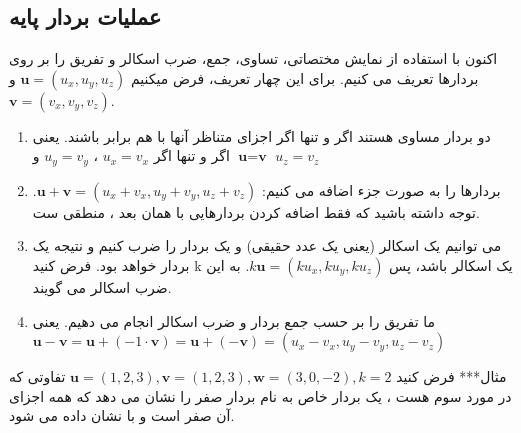 \subsection{\textbf{\LARGE عملیات بردار پایه}}
{
    \Large
    \begin{spacing}{1.5}
        اکنون با استفاده از نمایش مختصاتی، تساوی، جمع، ضرب اسکالر و تفریق را بر روی بردارها تعریف می کنیم.
        برای این چهار تعریف، فرض میکنیم $\textbf{u}=(u_{x},u_{y},u_{z})$ و  $\textbf{v}=(v_{x},v_{y},v_{z})$.

        \begin{enumerate}
            \item {دو بردار مساوی هستند اگر و تنها اگر اجزای متناظر آنها با هم برابر باشند.
            یعنی $\textbf{u}=\textbf{v}$ اگر و تنها اگر $u_{x}=v_{x}$ ، $u_{y}=v_{y}$ و $u_{z}=v_{z}$}
            \item {بردارها را به صورت جزء اضافه می کنیم: $\textbf{u}+\textbf{v}=(u_{x}+v_{x},u_{y}+v_{y},u_{z}+v_{z})$.
            توجه داشته باشید که فقط اضافه کردن بردارهایی با همان بعد ، منطقی ست.}
            \item {می توانیم یک اسکالر (یعنی یک عدد حقیقی) و یک بردار را ضرب کنیم و نتیجه یک بردار خواهد بود.
            فرض کنید k یک اسکالر باشد، پس $k\textbf{u}=(ku_{x},ku_{y},ku_{z})$. به این ضرب اسکالر می گویند.}
            \item {ما تفریق را بر حسب جمع بردار و ضرب اسکالر انجام می دهیم.
            یعنی $\textbf{u}-\textbf{v}=\textbf{u}+(-1\cdot\textbf{v})=\textbf{u}+(-\textbf{v})=(u_{x}-v_{x},u_{y}-v_{y},u_{z}-v_{z})$}
        \end{enumerate}

        مثال***
        فرض کنید $\textbf{u}=(1,2,3), \textbf{v}=(1,2,3), \textbf{w}=(3,0,-2), k=2$
        تفاوتی که در مورد سوم هست ، یک بردار خاص به نام بردار صفر را نشان می دهد که همه اجزای آن صفر است و با  نشان داده می شود.



\end{spacing}}
